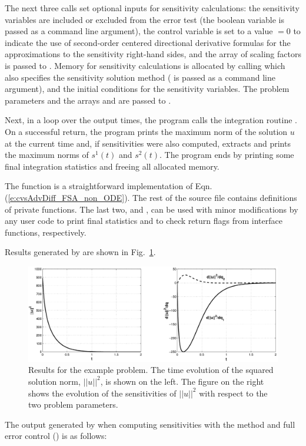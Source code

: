 The next three calls set optional inputs for sensitivity calculations: the sensitivity
variables are included or excluded from the error test (the boolean variable 
is passed as a command line argument), the control variable  is set to a value
 $=0$ to indicate  the use of second-order centered directional derivative
formulas for the approximations to the sensitivity right-hand sides, and the array of
scaling factors  is passed to {\cvodes}.
Memory for sensitivity calculations is allocated by calling 
which also specifies the sensitivity solution method ( is passed
as a command line argument), and the initial conditions for the sensitivity variables.
The problem parameters  and the arrays  and  are
passed to .

Next, in a loop over the  output times, the program calls the integration
routine . On a successful return, the program prints the maximum norm
of the solution $u$ at the current time and, if sensitivities were also computed, 
extracts and prints the maximum norms of $s^1(t)$ and $s^2(t)$.
The program ends by printing some final integration statistics and freeing all
allocated memory.

The  function is a straightforward implementation of Eqn.
(\ref{e:cvsAdvDiff_FSA_non_ODE}).  The rest of the source file
contains definitions of private functions.  The last
two,  and , can be used with minor
modifications by any {\cvodes} user code to print final {\cvodes}
statistics and to check return flags from {\cvodes} interface
functions, respectively.

Results generated by  are shown in Fig.~\ref{f:cvsAdvDiff_FSA_non}. 
\begin{figure}
  {\centerline{\includegraphics[width=\textwidth]{cvsfwdnonx}}}
  \caption{Results for the  example problem.
    The time evolution of the squared solution norm, $||u||^2$, is shown on the left. 
    The figure on the right shows the evolution of the sensitivities of $||u||^2$
    with respect to the two problem parameters.}
  \label{f:cvsAdvDiff_FSA_non}
\end{figure}
The output generated by  when computing
sensitivities with the  method and full error
control () is as follows:

